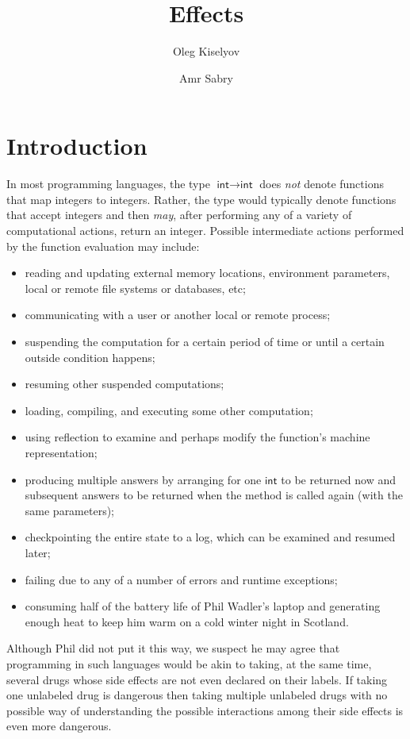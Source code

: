 \documentclass{llncs}
\begin{document}
\title{Effects}
\author{Oleg Kiselyov \and Amr Sabry}
\maketitle


\begin{abstract}

\keywords{}
\end{abstract}

\section{Introduction}

In most programming languages, the type
$\textsf{int} \rightarrow \textsf{int}$ does \emph{not} denote
functions that map integers to integers. Rather, the type would
typically denote functions that accept integers and then \emph{may},
after performing any of a variety of computational actions, return an
integer. Possible intermediate actions performed by the function
evaluation may include:
\begin{itemize}
\item reading and updating external memory locations, environment
  parameters, local or remote file systems or databases, etc;
\item communicating with a user or another local or remote process;
\item suspending the computation for a certain period of time or until
  a certain outside condition happens;
\item resuming other suspended computations;
\item loading, compiling, and executing some other computation;
\item using reflection to examine and perhaps modify the function's
  machine representation;
\item producing multiple answers by arranging for one $\textsf{int}$
  to be returned now and subsequent answers to be returned when the
  method is called again (with the same parameters);
\item checkpointing the entire state to a log, which can be examined
  and resumed later;
\item failing due to any of a number of errors and runtime exceptions;
\item consuming half of the battery life of Phil Wadler's laptop and
  generating enough heat to keep him warm on a cold winter night in
  Scotland.
\end{itemize}
Although Phil did not put it this way, we suspect he may agree that
programming in such languages would be akin to taking, at the same
time, several drugs whose side effects are not even declared on their
labels. If taking one unlabeled drug is dangerous then taking multiple
unlabeled drugs with no possible way of understanding the possible
interactions among their side effects is even more dangerous.
\end{document}
